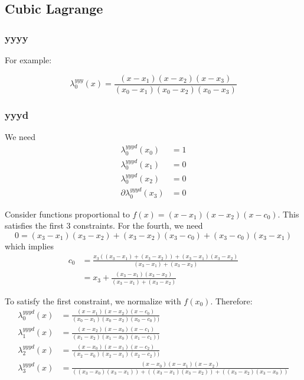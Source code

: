 \subsection{Cubic Lagrange}
 
\subsubsection{yyyy}

For example:

\begin{equation}
\lambda^{yyy}_0(x) = 
\frac {(x - x_1) (x - x_2) (x - x_3)} 
{(x_0 - x_1) (x_0 - x_2) (x_0 - x_3)}
\end{equation}

\subsubsection{yyyd}

We need 
\begin{align}
\lambda^{yyyd}_0(x_0) & = 1 \\ 
\lambda^{yyyd}_0(x_1) & = 0 \nonumber \\
\lambda^{yyyd}_0(x_2) & = 0 \nonumber \\
\partial\lambda^{yyyd}_0(x_3) & = 0 \nonumber 
\end{align}

Consider functions proportional to $f(x) = (x-x_1)(x-x_2)(x-c_0)$.
This satisfies the first $3$ constraints.
For the fourth, we need
\begin{equation}
0 = (x_3-x_1)(x_3-x_2) + (x_3-x_2)(x_3-c_0) + (x_3-c_0)(x_3-x_1)
\end{equation}
which implies
\begin{align}
c_0 & = 
\frac
{x_3\left((x_3-x_1)+ (x_3-x_2)\right) + (x_3-x_1)(x_3-x_2)}
{(x_3-x_1)+ (x_3-x_2)} 
\\
 &= x_3 + 
\frac
{(x_3-x_1)(x_3-x_2)}
{(x_3-x_1)+ (x_3-x_2)} 
\nonumber
\end{align}

To satisfy the first constraint,
we normalize with $f(x_0)$.
Therefore:
\begin{align}
\lambda^{yyyd}_0(x) & = 
\frac {(x - x_1) (x - x_2) (x - c_0)} 
{(x_0 - x_1) (x_0 - x_2) (x_0 - c_0))} 
\\
\lambda^{yyyd}_1(x) & = 
\frac {(x - x_2) (x - x_0) (x - c_1)} 
{(x_1 - x_2) (x_1 - x_0) (x_1 - c_1))} 
\nonumber \\
\lambda^{yyyd}_2(x) & = 
\frac {(x - x_0) (x - x_1) (x - c_2)} 
{(x_2 - x_0) (x_2 - x_1) (x_2 - c_2))} 
\nonumber \\
\lambda^{yyyd}_3(x) & = 
\frac {(x - x_0) (x - x_1) (x - x_2)} 
{\left( (x_3 - x_0) (x_3 - x_1) \right)
+ \left( (x_3 - x_1) (x_3 - x_2) \right)
+ \left( (x_3 - x_2) (x_3 - x_0) \right)} 
\nonumber
\end{align}

